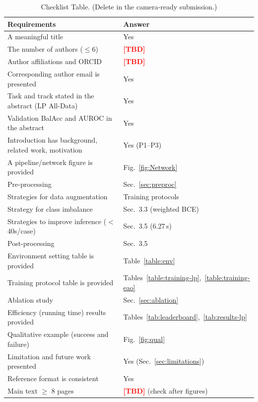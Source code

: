 \documentclass[runningheads]{llncs}
\newcommand{\tba}{\textcolor{red}{\textbf{[TBD]}}}
\begin{document}
\newpage
\begin{table}[!htbp]
\caption{Checklist Table. (Delete in the camera-ready submission.)}
\centering
\begin{tabular}{ll}
\hline
Requirements & Answer \\ \hline
A meaningful title & Yes \\ \hline
The number of authors ($\leq$6) & \tba{} \\ \hline
Author affiliations and ORCID & \tba{} \\ \hline
Corresponding author email is presented & Yes \\ \hline
Task and track stated in the abstract (LP All-Data) & Yes \\ \hline
Validation BalAcc and AUROC in the abstract & Yes \\ \hline
Introduction has background, related work, motivation & Yes (P1--P3) \\ \hline
A pipeline/network figure is provided & Fig.~\ref{fig:Network} \\ \hline
Pre-processing & Sec.~\ref{sec:preproc} \\ \hline
Strategies for data augmentation & Training protocols \\ \hline
Strategy for class imbalance & Sec.~3.3 (weighted BCE) \\ \hline
Strategies to improve inference ($<$40s/case) & Sec.~3.5 (6.27\,s) \\ \hline
Post-processing & Sec.~3.5 \\ \hline
Environment setting table is provided & Table~\ref{table:env} \\ \hline
Training protocol table is provided & Tables~\ref{table:training-lp},~\ref{table:training-eao} \\ \hline
Ablation study & Sec.~\ref{sec:ablation} \\ \hline
Efficiency (running time) results provided & Tables~\ref{tab:leaderboard},~\ref{tab:results-lp} \\ \hline
Qualitative example (success and failure) & Fig.~\ref{fig:qual} \\ \hline
Limitation and future work presented & Yes (Sec.~\ref{sec:limitations}) \\ \hline
Reference format is consistent & Yes \\ \hline
Main text $\geq$ 8 pages & \tba{} (check after figures) \\ \hline
\end{tabular}
\end{table}
\end{document}
